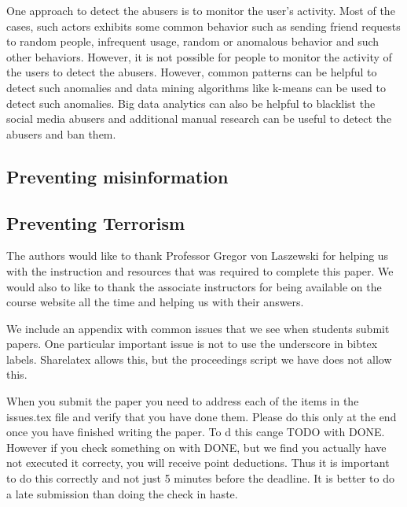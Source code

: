 \documentclass[sigconf]{acmart}
\begin{document}
One approach to detect the abusers is to monitor the user's activity. Most of the cases, such actors exhibits some common behavior such as sending friend requests to random people, infrequent usage, random or anomalous behavior and such other behaviors. However, it is not possible for people to monitor the activity of the users to detect the abusers. However, common patterns can be helpful to detect such anomalies and data mining algorithms like k-means can be used to detect such anomalies. Big data analytics can also be helpful to blacklist the social media abusers and additional manual research can be useful to detect the abusers and ban them. 


\subsection{Preventing misinformation}
\subsection{Preventing Terrorism}




\begin{acks}

The authors would like to thank Professor Gregor von Laszewski for helping us with the instruction and resources that was required to complete this paper. We would also to like to thank the associate instructors for being available on the course website all the time and helping us with their answers.

\end{acks}


 

\appendix

We include an appendix with common issues that we see when students
submit papers. One particular important issue is not to use the
underscore in bibtex labels. Sharelatex allows this, but the
proceedings script we have does not allow this.

When you submit the paper you need to address each of the items in the
issues.tex file and verify that you have done them. Please do this
only at the end once you have finished writing the paper. To d this
cange TODO with DONE. However if you check something on with DONE, but
we find you actually have not executed it correcty, you will receive
point deductions. Thus it is important to do this correctly and not
just 5 minutes before the deadline. It is better to do a late
submission than doing the check in haste. 


\end{document}
